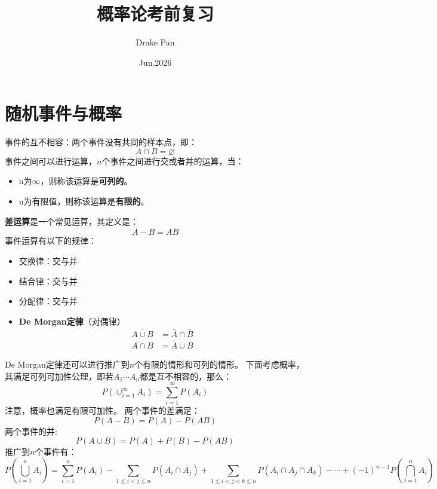 \documentclass[a4paper]{ctexart}
\title{概率论考前复习}
\author{Drake Pan}
\date{Jun.2026}
\begin{document}
\maketitle
\newpage
\tableofcontents
\newpage

\section{随机事件与概率}

事件的互不相容：两个事件没有共同的样本点，即：
\begin{equation}
    A \cap B = \varnothing
\end{equation}
事件之间可以进行运算，$n$个事件之间进行交或者并的运算，当：
\begin{itemize}
    \item n为$\infty$，则称该运算是\textbf{可列的}。
    \item n为有限值，则称该运算是\textbf{有限的}。
\end{itemize}
\textbf{差运算}是一个常见运算，其定义是：
\begin{equation}
    A-B=A\overline{B}
\end{equation}
事件运算有以下的规律：
\begin{itemize}
    \item 交换律：交与并
    \item 结合律：交与并
    \item 分配律：交与并
    \item \textbf{De Morgan定律}（对偶律）
        \[
        \begin{aligned}
            \overline{A \cup B} &= \bar{A} \cap \bar{B} \\[6pt]
            \overline{A \cap B} &= \bar{A} \cup \bar{B}
        \end{aligned}
        \]
\end{itemize}
De Morgan定律还可以进行推广到$n$个有限的情形和可列的情形。
下面考虑概率，其满足可列可加性公理，即若$A_1\cdots A_n$都是互不相容的，那么：
\begin{equation}
    P(\cup_{i=1}^{\infty} A_i) = \sum_{i=1}^{\infty} P(A_i)
\end{equation}
注意，概率也满足有限可加性。
两个事件的差满足：
\begin{equation}
    P(A-B)=P(A)-P(AB)
\end{equation}
两个事件的并:
\begin{equation}
    P(A\cup B) = P(A)+P(B)-P(AB)
\end{equation}
推广到$n$个事件有：
\begin{equation}
    P\left(\bigcup_{i=1}^{n} A_i\right) = \sum_{ i=1}^{n} P(A_i) - \sum_{1 \leq i < j \leq n} P(A_i \cap A_j) + \sum_{1 \leq i < j < k \leq n} P(A_i \cap A_j \cap A_k) - \cdots + (-1)^{n-1} P\left(\bigcap_{i=1}^{n} A_i\right)
\end{equation}
\end{document}
